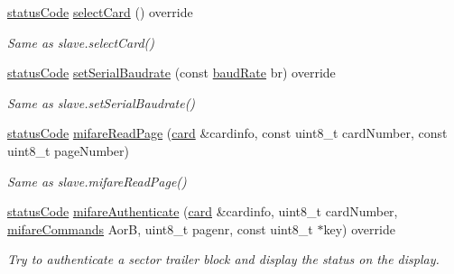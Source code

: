 \begin{DoxyCompactItemize}
\hyperlink{declarations_8h_ae1d20c5a38cae82ccaa6a77be3fd264b}{status\+Code} \hyperlink{classnfc_1_1NfcOled_a7ae4a0942240950d8db41b75c898cb3c}{select\+Card} () override
\begin{DoxyCompactList}\small\item\em Same as slave.\+select\+Card() \end{DoxyCompactList}\item 
\mbox{\label{classnfc_1_1NfcOled_aadcb1a6a9e6241c80ecd50de0d108907}} 
\hyperlink{declarations_8h_ae1d20c5a38cae82ccaa6a77be3fd264b}{status\+Code} \hyperlink{classnfc_1_1NfcOled_aadcb1a6a9e6241c80ecd50de0d108907}{set\+Serial\+Baudrate} (const \hyperlink{declarations_8h_a18236cb00569a8f612f8957044868f74}{baud\+Rate} br) override
\begin{DoxyCompactList}\small\item\em Same as slave.\+set\+Serial\+Baudrate() \end{DoxyCompactList}\item 
\mbox{\label{classnfc_1_1NfcOled_a87d38aa8fcb687e276f18ae691b4ff0f}} 
\hyperlink{declarations_8h_ae1d20c5a38cae82ccaa6a77be3fd264b}{status\+Code} \hyperlink{classnfc_1_1NfcOled_a87d38aa8fcb687e276f18ae691b4ff0f}{mifare\+Read\+Page} (\hyperlink{classcard}{card} \&cardinfo, const uint8\+\_\+t card\+Number, const uint8\+\_\+t page\+Number)
\begin{DoxyCompactList}\small\item\em Same as slave.\+mifare\+Read\+Page() \end{DoxyCompactList}\item 
\mbox{\label{classnfc_1_1NfcOled_a1168a23f48bec44eae8d65a1625736e5}} 
\hyperlink{declarations_8h_ae1d20c5a38cae82ccaa6a77be3fd264b}{status\+Code} \hyperlink{classnfc_1_1NfcOled_a1168a23f48bec44eae8d65a1625736e5}{mifare\+Authenticate} (\hyperlink{classcard}{card} \&cardinfo, uint8\+\_\+t card\+Number, \hyperlink{declarations_8h_a305b1a3bcfca65e2a82f0f9d24676835}{mifare\+Commands} AorB, uint8\+\_\+t pagenr, const uint8\+\_\+t $\ast$key) override
\begin{DoxyCompactList}\small\item\em Try to authenticate a sector trailer block and display the status on the display. \end{DoxyCompactList}\item 
\mbox{\label{classnfc_1_1NfcOled_a547e3a810432ebbb3e9a03dc7c2fa0c8}} 

\end{DoxyCompactItemize}
